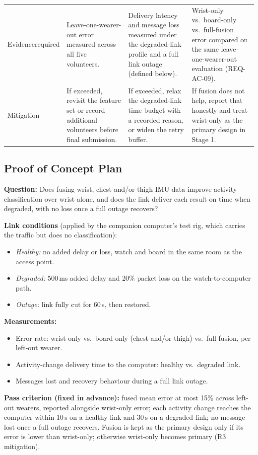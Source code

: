 \begin{table}[t]
\begin{tabular}{p{1.9cm}p{4.95cm}p{4.95cm}p{4.95cm}}
Evidence\newline required &
Leave-one-wearer-out error measured across all five volunteers. &
Delivery latency and message loss measured under the
degraded-link profile and a full link outage (defined below). &
Wrist-only vs.\ board-only vs.\ full-fusion error compared on
the same leave-one-wearer-out evaluation (REQ-AC-09). \\[0.6em]

Mitigation &
If exceeded, revisit the feature set or record additional
volunteers before final submission. &
If exceeded, relax the degraded-link time budget with a
recorded reason, or widen the retry buffer. &
If fusion does not help, report that honestly and treat
wrist-only as the primary design in Stage 1. \\
\bottomrule
\end{tabular}
\end{table}

\subsection{Proof of Concept Plan}

\textbf{Question:} Does fusing wrist, chest and/or thigh IMU data
improve activity classification over wrist alone, and does the
link deliver each result on time when degraded, with no loss once
a full outage recovers?

\textbf{Link conditions} (applied by the companion computer's
test rig, which carries the traffic but does no classification):
\begin{itemize}
\item \emph{Healthy:} no added delay or loss, watch and board in
the same room as the access point.
\item \emph{Degraded:} 500\,ms added delay and 20\% packet loss
on the watch-to-computer path.
\item \emph{Outage:} link fully cut for 60\,s, then restored.
\end{itemize}

\textbf{Measurements:}
\begin{itemize}
\item Error rate: wrist-only vs.\ board-only (chest and/or thigh)
vs.\ full fusion, per left-out wearer.
\item Activity-change delivery time to the computer: healthy vs.\
degraded link.
\item Messages lost and recovery behaviour during a full link
outage.
\end{itemize}

\textbf{Pass criterion (fixed in advance):} fused mean error at
most 15\% across left-out wearers, reported alongside wrist-only
error; each activity change reaches the computer within 10\,s on
a healthy link and 30\,s on a degraded link; no message lost once
a full outage recovers. Fusion is kept as the primary design only
if its error is lower than wrist-only; otherwise wrist-only
becomes primary (R3 mitigation).
